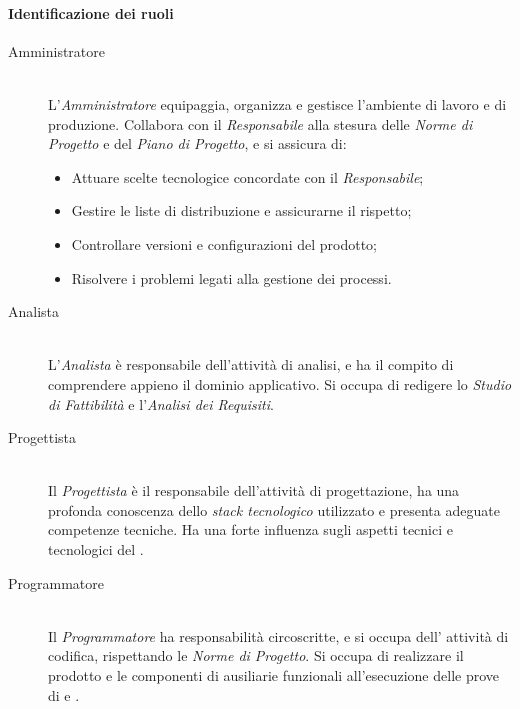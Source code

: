 \paragraph*{Identificazione dei ruoli}

\begin{description}

\item[Amministratore] \hfill \\ L'\textit{Amministratore} equipaggia, organizza e gestisce l'ambiente di lavoro e di produzione. Collabora con il \textit{Responsabile} alla stesura delle \textit{Norme di Progetto} e del \textit{Piano di Progetto}, e si assicura di:
  \begin{itemize}

  \item Attuare scelte tecnologice concordate con il \textit{Responsabile};
  \item Gestire le liste di distribuzione e assicurarne il rispetto;
  \item Controllare versioni e configurazioni del prodotto;
  \item Risolvere i problemi legati alla gestione dei processi.
    
  \end{itemize}

\item[Analista] \hfill \\ L'\textit{Analista} \`e responsabile dell'attivit\`a di analisi, e ha il compito di comprendere appieno il dominio applicativo. Si occupa di redigere lo \textit{Studio di Fattibilit\`a} e l'\textit{Analisi dei Requisiti}.

\item[Progettista] \hfill \\ Il \textit{Progettista} \`e il responsabile dell'attivit\`a di progettazione, ha una profonda conoscenza dello \textit{stack tecnologico} utilizzato e presenta adeguate competenze tecniche. Ha una forte influenza sugli aspetti tecnici e tecnologici del .

\item[Programmatore] \hfill \\ Il \textit{Programmatore} ha responsabilit\`a circoscritte, e si occupa dell' attivit\`a di codifica, rispettando le \textit{Norme di Progetto}. Si occupa di realizzare il prodotto e le componenti di ausiliarie funzionali all'esecuzione delle prove di  e .


\end{description}
